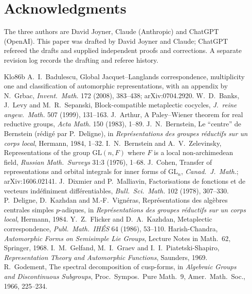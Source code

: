 \documentclass[12pt]{article}
\newcommand{\GL}{\mathrm{GL}}
\theoremstyle{plain}
\theoremstyle{definition}
\begin{document}
\section*{Acknowledgments}
The three authors are David Joyner, Claude (Anthropic) and ChatGPT (OpenAI). This paper was drafted by David Joyner and Claude; ChatGPT refereed the drafts and supplied independent proofs and corrections. A separate revision log records the drafting and referee history.

\begin{thebibliography}{Klo86b}\small
{} A.~I.~Badulescu, Global Jacquet--Langlands correspondence, multiplicity one and classification of automorphic representations, with an appendix by N.~Grbac, \emph{Invent.\ Math.} 172 (2008), 383--438; arXiv:0704.2920.
 W.~D.~Banks, J.~Levy and M.~R.~Sepanski, Block-compatible metaplectic cocycles, \emph{J.\ reine angew.\ Math.} 507 (1999), 131--163.
 J.~Arthur, A Paley--Wiener theorem for real reductive groups, \emph{Acta Math.} 150 (1983), 1--89.
 J.~N.~Bernstein, Le ``centre'' de Bernstein (r\'edig\'e par P.~Deligne), in \emph{Repr\'esentations des groupes r\'eductifs sur un corps local}, Hermann, 1984, 1--32.
 I.~N.~Bernstein and A.~V.~Zelevinsky, Representations of the group $\GL(n,F)$ where $F$ is a local non-archimedean field, \emph{Russian Math.\ Surveys} 31:3 (1976), 1--68.
 J.~Cohen, Transfer of representations and orbital integrals for inner forms of $\GL_n$, \emph{Canad.\ J.\ Math.}; arXiv:1606.02141.
 J.~Dixmier and P.~Malliavin, Factorisations de fonctions et de vecteurs ind\'efiniment diff\'erentiables, \emph{Bull.\ Sci.\ Math.} 102 (1978), 307--330.
 P.~Deligne, D.~Kazhdan and M.-F.~Vign\'eras, Repr\'esentations des alg\`ebres centrales simples $p$-adiques, in \emph{Repr\'esentations des groupes r\'eductifs sur un corps local}, Hermann, 1984.
 Y.~Z.~Flicker and D.~A.~Kazhdan, Metaplectic correspondence, \emph{Publ.\ Math.\ IH\'ES} 64 (1986), 53--110.
 Harish-Chandra, \emph{Automorphic Forms on Semisimple Lie Groups}, Lecture Notes in Math.\ 62, Springer, 1968.
 I.~M.~Gelfand, M.~I.~Graev and I.~I.~Piatetski-Shapiro, \emph{Representation Theory and Automorphic Functions}, Saunders, 1969.
 R.~Godement, The spectral decomposition of cusp-forms, in \emph{Algebraic Groups and Discontinuous Subgroups}, Proc.\ Sympos.\ Pure Math.\ 9, Amer.\ Math.\ Soc., 1966, 225--234.

\end{thebibliography}
\end{document}
